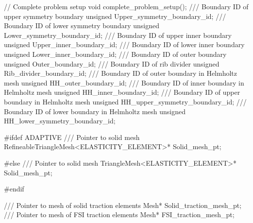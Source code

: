 \begin{DoxyCodeInclude}
 \textcolor{comment}{// Complete problem setup}
 \textcolor{keywordtype}{void} complete\_problem\_setup();
\textcolor{comment}{}
\textcolor{comment}{ /// Boundary ID of upper symmetry boundary}
\textcolor{comment}{} \textcolor{keywordtype}{unsigned} Upper\_symmetry\_boundary\_id;
\textcolor{comment}{}
\textcolor{comment}{ /// Boundary ID of lower symmetry boundary}
\textcolor{comment}{} \textcolor{keywordtype}{unsigned} Lower\_symmetry\_boundary\_id;
\textcolor{comment}{}
\textcolor{comment}{ /// Boundary ID of upper inner boundary}
\textcolor{comment}{} \textcolor{keywordtype}{unsigned} Upper\_inner\_boundary\_id;
\textcolor{comment}{}
\textcolor{comment}{ /// Boundary ID of lower inner boundary}
\textcolor{comment}{} \textcolor{keywordtype}{unsigned} Lower\_inner\_boundary\_id;
\textcolor{comment}{}
\textcolor{comment}{ /// Boundary ID of outer boundary}
\textcolor{comment}{} \textcolor{keywordtype}{unsigned} Outer\_boundary\_id;
\textcolor{comment}{}
\textcolor{comment}{ /// Boundary ID of rib divider}
\textcolor{comment}{} \textcolor{keywordtype}{unsigned} Rib\_divider\_boundary\_id;
\textcolor{comment}{}
\textcolor{comment}{ /// Boundary ID of outer boundary in Helmholtz mesh}
\textcolor{comment}{} \textcolor{keywordtype}{unsigned} HH\_outer\_boundary\_id;
\textcolor{comment}{}
\textcolor{comment}{ /// Boundary ID of inner boundary in Helmholtz mesh}
\textcolor{comment}{} \textcolor{keywordtype}{unsigned} HH\_inner\_boundary\_id;
\textcolor{comment}{}
\textcolor{comment}{ /// Boundary ID of upper boundary in Helmholtz mesh}
\textcolor{comment}{} \textcolor{keywordtype}{unsigned} HH\_upper\_symmetry\_boundary\_id;
\textcolor{comment}{}
\textcolor{comment}{ /// Boundary ID of lower boundary in Helmholtz mesh}
\textcolor{comment}{} \textcolor{keywordtype}{unsigned} HH\_lower\_symmetry\_boundary\_id;

\textcolor{preprocessor}{#ifdef ADAPTIVE}
\textcolor{comment}{}
\textcolor{comment}{ /// Pointer to solid mesh}
\textcolor{comment}{} RefineableTriangleMesh<ELASTICITY\_ELEMENT>* Solid\_mesh\_pt;

\textcolor{preprocessor}{#else}
\textcolor{comment}{}
\textcolor{comment}{ /// Pointer to solid mesh}
\textcolor{comment}{} TriangleMesh<ELASTICITY\_ELEMENT>* Solid\_mesh\_pt;

\textcolor{preprocessor}{#endif}

\textcolor{comment}{}
\textcolor{comment}{ /// Pointer to mesh of solid traction elements}
\textcolor{comment}{} Mesh* Solid\_traction\_mesh\_pt;
\textcolor{comment}{}
\textcolor{comment}{ /// Pointer to mesh of FSI traction elements}
\textcolor{comment}{} Mesh* FSI\_traction\_mesh\_pt;


\end{DoxyCodeInclude}
